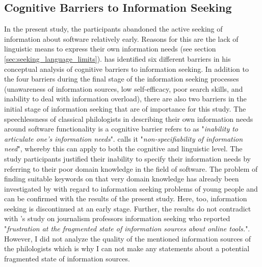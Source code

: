\documentclass[12pt, a4paper, titlepage, oneside, abstract=true, toc=listof, toc=bibliography, BCOR=1cm]{scrreprt}
\begin{document}
{\subsection*{Cognitive Barriers to Information Seeking}
In the present study, the participants abandoned the active seeking of information about software relatively early. Reasons for this are the lack of linguistic means to express their own information needs (see section \ref{sec:seeking_language_limits}). \citep{Savolainen2015a} has identified six different barriers in his conceptual analysis of cognitive barriers to information seeking. In addition to the four barriers during the final stage of the information seeking processes (unawareness of information sources, low self-efficacy, poor search skills, and inability to deal with information overload), there are also two barriers in the initial stage of information seeking that are of importance for this study. The speechlessness of classical philologists in describing their own information needs around software functionality is a cognitive barrier \citet[p. 616]{Savolainen2015a} refers to as "\textit{inability to articulate one's information needs}". \citet[p. 137]{Belkin1980} calls it "\textit{non-specifiability of information need}", whereby this can apply to both the cognitive and linguistic level.  The study participants justified their inability to specify their information needs by referring to their poor domain knowledge \citep[p. 619]{Savolainen2015a} in the field of software. The problem of finding suitable keywords on that very domain knowledge has already been investigated by \citet[p. 285]{Shenton2012} with regard to information seeking problems of young people and can be confirmed with the results of the present study. Here, too, information seeking is discontinued at an early stage. Further, the results do not contradict with \citet{Hepworth2017}'s study on journalism professors information seeking who reported "\textit{frustration at the fragmented state of information sources about online tools.}". However, I did not analyze the quality of the mentioned information sources of the philologists which is why I can not make any statements about a potential fragmented state of information sources.

}
\end{document}
